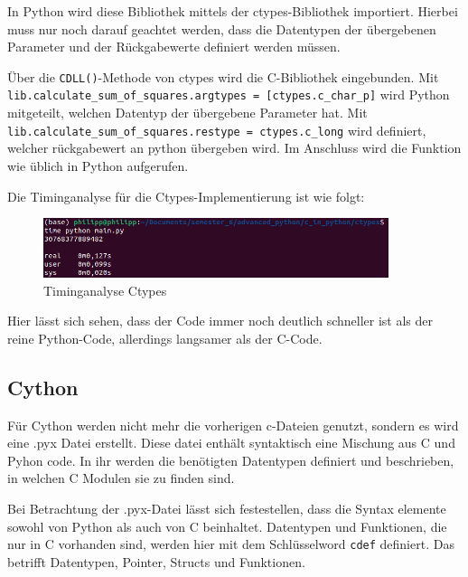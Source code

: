 \documentclass[a4paper, parskip=half]{scrartcl}
\begin{document}
In Python wird diese Bibliothek mittels der ctypes-Bibliothek importiert. Hierbei muss nur noch darauf geachtet werden, dass die Datentypen der übergebenen Parameter und der Rückgabewerte definiert werden müssen.



Über die \lstinline{CDLL()}-Methode von ctypes wird die C-Bibliothek eingebunden. 
Mit \lstinline{lib.calculate_sum_of_squares.argtypes = [ctypes.c_char_p]} wird Python mitgeteilt, welchen Datentyp der übergebene Parameter hat. Mit \lstinline{lib.calculate_sum_of_squares.restype = ctypes.c_long} wird definiert, welcher rückgabewert an python übergeben wird.  
Im Anschluss wird die Funktion wie üblich in Python aufgerufen. 

Die Timinganalyse für die Ctypes-Implementierung ist wie folgt:

\begin{figure}[H]
    \centering
    \includegraphics[width=0.9\textwidth]{ctypes/timing_ctypes.png}
    \caption{Timinganalyse Ctypes}
    \label{fig:timing-ctypes}
\end{figure}


Hier lässt sich sehen, dass der Code immer noch deutlich schneller ist als der reine Python-Code, allerdings langsamer als der C-Code.

\subsection{Cython}

Für Cython werden nicht mehr die vorherigen c-Dateien genutzt, sondern es wird eine .pyx Datei erstellt. Diese datei enthält syntaktisch eine Mischung aus C und Pyhon code. In ihr werden die benötigten Datentypen definiert und beschrieben, in welchen C Modulen sie zu finden sind. \cite{cython-syntax}



Bei Betrachtung der .pyx-Datei lässt sich festestellen, dass die Syntax elemente sowohl von Python als auch von C beinhaltet. 
Datentypen und Funktionen, die nur in C vorhanden sind, werden hier mit dem Schlüsselword \lstinline{cdef} definiert. Das betrifft Datentypen, Pointer, Structs und Funktionen. 
\end{document}
